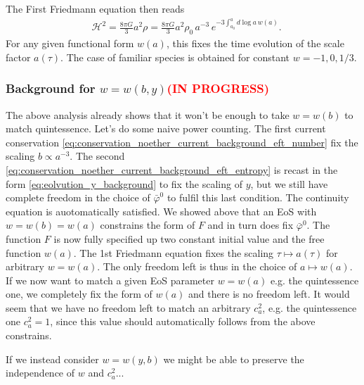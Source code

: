 The First Friedmann equation then reads
\begin{align}
    &\mathcal{H}^2 = \frac{8\pi G}{3} a^2 \rho = \frac{8\pi G}{3} a^2 \rho_0 \, a^{-3}\, e^{-3\int_{a_0}^a\!\!d\log\!a\, w(a)}.
\end{align}
For any given functional form $w(a)$, this fixes the time evolution of the scale factor $a(\tau)$.
The case of familiar species is obtained for constant $w=-1,0,1/3$.


\subsubsection{Background for $w=w(b,y)$\textcolor{red}{(IN PROGRESS)}}\label{sec:bkg_evolution_eft_wby}
%
The above analysis already shows that it won't be enough to take $w=w(b)$ to match quintessence.
Let's do some naive power counting.
The first current conservation \eqref{eq:conservation_noether_current_background_eft_number} fix the scaling $b\propto a^{-3}$.
The second \eqref{eq:conservation_noether_current_background_eft_entropy} is recast in the form \eqref{eq:eolvution_y_background} to fix the scaling of $y$, but we still have complete freedom in the choice of $\bar{\varphi}^0$ to fulfil this last condition.
The continuity equation is auotomatically satisfied.
We showed above that an EoS with $w=w(b)=w(a)$ constrains the form of $F$ and in turn does fix $\bar{\varphi}^0$.
The function $F$ is now fully specified up two constant initial value and the free function $w(a)$.
The 1st Friedmann equation fixes the scaling $\tau \mapsto a(\tau)$ for arbitrary $w=w(a)$.
The only freedom left is thus in the choice of $a\mapsto w(a)$.
If we now want to match a given EoS parameter $w=w(a)$ e.g. the quintessence one, we completely fix the form of $w(a)$ and there is no freedom left.
It would seem that we have no freedom left to match an arbitrary $c_a^2$, e.g. the quintessence one $c_a^2=1$, since this value should automatically follows from the above constrains. 

If we instead consider $w=w(y,b)$ we might be able to preserve the independence of $w$ and $c_a^2$...











